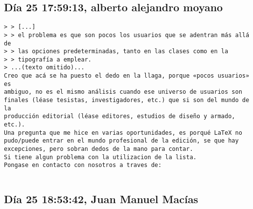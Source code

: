 \documentclass[a4paper,10pt]{article}
\begin{document}
\subsection{Día 25 17:59:13, alberto alejandro moyano}

\begin{lstlisting}
> > [...]
> > el problema es que son pocos los usuarios que se adentran más allá de
> > las opciones predeterminadas, tanto en las clases como en la
> > tipografía a emplear.
> ...(texto omitido)...
Creo que acá se ha puesto el dedo en la llaga, porque «pocos usuarios» es
ambiguo, no es el mismo análisis cuando ese universo de usuarios son
finales (léase tesistas, investigadores, etc.) que si son del mundo de la
producción editorial (léase editores, estudios de diseño y armado, etc.).
Una pregunta que me hice en varias oportunidades, es porqué LaTeX no
pudo/puede entrar en el mundo profesional de la edición, se que hay
excepciones, pero sobran dedos de la mano para contar.
Si tiene algun problema con la utilizacion de la lista.
Pongase en contacto con nosotros a traves de:


\end{lstlisting}

\subsection{Día 25 18:53:42, Juan Manuel Macías}
\end{document}

